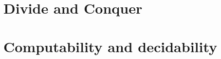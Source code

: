 









\tableofcontents
\newpage
{}





\part{Divide and Conquer}












\part{Computability and decidability}







